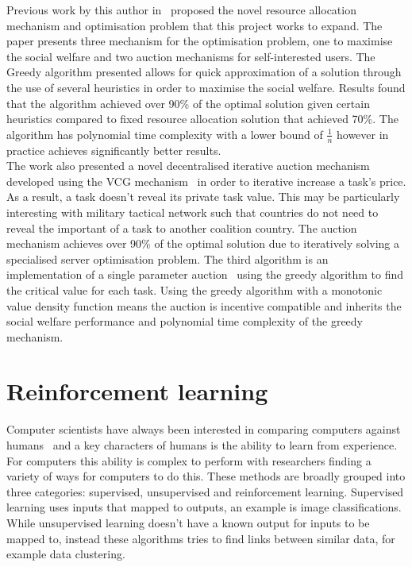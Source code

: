 Previous work by this author in~\cite{FlexibleResourceAllocation} proposed the novel resource allocation mechanism and
optimisation problem that this project works to expand. The paper presents three mechanism for the optimisation problem,
one to maximise the social welfare and two auction mechanisms for self-interested users. The Greedy algorithm presented
allows for quick approximation of a solution through the use of several heuristics in order to maximise the social
welfare. Results found that the algorithm achieved over 90\% of the optimal solution given certain heuristics compared
to fixed resource allocation solution that achieved 70\%. The algorithm has polynomial time complexity with a lower
bound of $\frac{1}{n}$ however in practice achieves significantly better results. \\
The work also presented a novel decentralised iterative auction mechanism developed using the VCG
mechanism~\citep{vickrey, Clarke, groves} in order to iterative increase a task's price. As a result, a task doesn't
reveal its private task value. This may be particularly interesting with military tactical network such that countries
do not need to reveal the important of a task to another coalition country. The auction mechanism achieves over 90\% of
the optimal solution due to iteratively solving a specialised server optimisation problem. The third algorithm is an
implementation of a single parameter auction~\citep{nisan2007algorithmic_critical_value} using the greedy algorithm to
find the critical value for each task. Using the greedy algorithm with a monotonic value density function means the
auction is incentive compatible and inherits the social welfare performance and polynomial time complexity of the
greedy mechanism.

\section{Reinforcement learning}\label{sec:reinforcement-learning}
Computer scientists have always been interested in comparing computers against humans~\citep{turing1950computing} and a
key characters of humans is the ability to learn from experience. For computers this ability is complex to perform with
researchers finding a variety of ways for computers to do this. These methods are broadly grouped into three categories:
supervised, unsupervised and reinforcement learning. Supervised learning uses inputs that mapped to outputs, an example
is image classifications. While unsupervised learning doesn't have a known output for inputs to be mapped to, instead
these algorithms tries to find links between similar data, for example data clustering.

